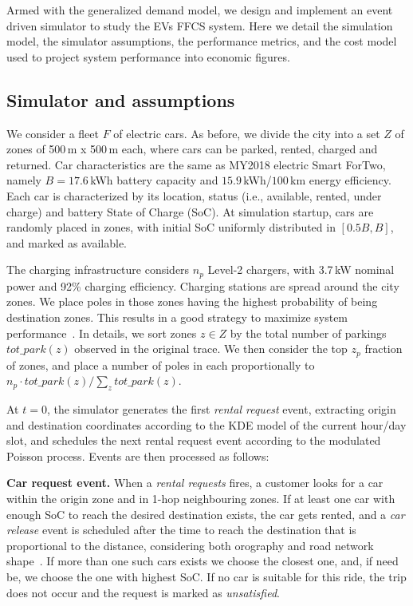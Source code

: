 Armed with the generalized demand model, we design and implement an event driven simulator to study the EVs FFCS system. Here we detail the simulation model, the simulator assumptions, the performance metrics, and the cost model used to project system performance into economic figures.

\subsection{Simulator and assumptions}

We consider a fleet $F$ of electric cars. As before, we divide the city into a set $Z$ of zones of 500\,m x 500\,m each, where  cars can be parked, rented, charged and returned. Car characteristics are the same as MY2018 electric Smart ForTwo, namely $B=17.6$\,kWh battery capacity and $15.9$\,kWh/$100$\,km energy efficiency. Each car is characterized by its location, status (i.e., available, rented, under charge) and battery State of Charge (SoC). 
At simulation startup, cars are randomly placed in zones, with initial SoC uniformly distributed in $[0.5 B , B]$, and marked as available.

The charging infrastructure considers $n_p$ Level-2 chargers, with 3.7\,kW nominal power and 92\% charging efficiency. Charging stations are spread around the city zones. We place poles in those zones having the highest probability of being destination zones. This results in a good strategy to maximize system performance~\cite{7_cocca2019free,8_cocca2019free}. In details, we sort zones $z\in Z$ by the total number of parkings $tot\_park(z)$ observed in the original trace. We then consider the top $z_{p}$ fraction of zones, and place a number of poles in each proportionally to
$
{n_p \cdot tot\_park(z)/\sum_z tot\_park(z)}
$.


At $t=0$, the simulator generates the first \emph{rental request} event, extracting origin and destination coordinates according to the KDE model of the current hour/day slot, and schedules the next rental request event according to the modulated Poisson process. Events are then processed as follows:


\textbf{Car request event.}
When a \emph{rental requests} fires, a customer looks for a car within the origin zone and in 1-hop neighbouring zones.
If at least one car with enough SoC to reach the desired destination exists, the car gets rented, and a \emph{car release} event is scheduled after the time to reach the destination that is proportional to the distance, considering both orography and road network shape~\cite{8_cocca2019free}. If more than one such cars exists we choose the closest one, and, if need be, we choose the one with highest SoC.  
If no car is suitable for this ride, the trip does not occur and the request is marked as \emph{unsatisfied}.




